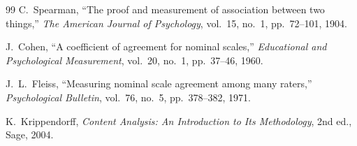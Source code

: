 \begin{thebibliography}{99}
 C.~Spearman, ``The proof and measurement of association between two things,'' \emph{The American Journal of Psychology}, vol.~15, no.~1, pp.~72--101, 1904.

 J.~Cohen, ``A coefficient of agreement for nominal scales,'' \emph{Educational and Psychological Measurement}, vol.~20, no.~1, pp.~37--46, 1960.

 J.~L.~Fleiss, ``Measuring nominal scale agreement among many raters,'' \emph{Psychological Bulletin}, vol.~76, no.~5, pp.~378--382, 1971.

 K.~Krippendorff, \emph{Content Analysis: An Introduction to Its Methodology}, 2nd ed., Sage, 2004.

\end{thebibliography}
